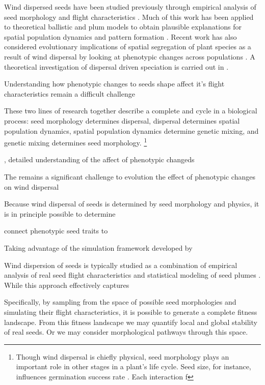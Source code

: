 \documentclass[annual]{acmsiggraph}
\begin{document}
Wind dispersed seeds have been studied previously through empirical analysis of seed morphology and flight characteristics \cite{augspurger1986}.  Much of this work has been applied to  theoretical ballistic and plum models  to obtain plausible explanations for spatial population dynamics and pattern formation \cite{levin2003}. Recent work has also considered  evolutionary implications of spatial segregation of  plant species as a result of wind dispersal by looking at phenotypic changes across  populations \cite{Cheptou2008}.   A theoretical investigation of dispersal driven speciation is carried out in \cite{levin2010}.    

Understanding how phenotypic changes to seeds shape affect it's flight characteristics remain a difficult challenge



These two lines of research together  describe a complete and cycle in a biological process: seed morphology determines  dispersal, dispersal determines spatial population dynamics, spatial population dynamics determine genetic mixing, and genetic mixing determines seed morphology. \footnote{Though wind dispersal is chiefly physical, seed morphology  plays an important  role in other stages in a plant's life cycle. Seed size, for instance, influences germination success rate \cite{greene2005}.  Each interaction f}





, detailed understanding of the affect of phenotypic changeds    

The remains a significant challenge to evolution the effect of phenotypic changes on wind dispersal   


Because wind dispersal of seeds is determined by seed morphology and physics, it is in principle possible to determine 

 connect phenotypic seed traits to  

Taking advantage of the simulation framework developed by 




Wind dispersion of seeds is typically studied as a combination of empirical analysis of real seed flight characteristics and statistical modeling of seed plumes   .  While this approach effectively captures 


 Specifically, by sampling from the space of possible seed morphologies and simulating their flight characteristics, it is possible to generate a complete fitness landscape.  From this fitness landscape we may quantify local and global stability of real seeds.  Or we may consider morphological pathways through this space.  
 
\end{document}
